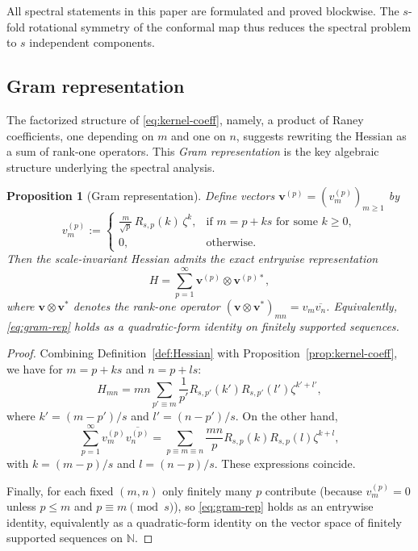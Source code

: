 \documentclass[11pt]{amsart}
\numberwithin{equation}{section}
\theoremstyle{plain}
\newtheorem{proposition}[theorem]{Proposition}
\theoremstyle{definition}
\theoremstyle{remark}
\begin{document}
All spectral statements in this paper are formulated and proved blockwise. The
$s$-fold rotational symmetry of the conformal map thus reduces the spectral
problem to $s$ independent components.

\subsection{Gram representation}
\label{subsec:gram-representation}

The factorized structure of \eqref{eq:kernel-coeff}, namely, a product of Raney
coefficients, one depending on $m$ and one on $n$, suggests rewriting
the Hessian as a sum of rank-one operators. This \emph{Gram representation}
is the key algebraic structure underlying the spectral analysis.

\begin{proposition}[Gram representation]
	\label{prop:gram}
	Define vectors $\bm{v}^{(p)} = (v^{(p)}_{m})_{m \ge 1}$ by
	\begin{equation}\label{eq:gram-vector}
		v^{(p)}_{m} :=
		\begin{cases}
			\displaystyle \frac{m}{\sqrt{p}} \, R_{s,p}(k) \, \zeta^k,
			   & \text{if } m = p + ks \text{ for some } k \ge 0, \\[1ex]
			0, & \text{otherwise}.
		\end{cases}
	\end{equation}
	Then the scale-invariant Hessian admits the exact entrywise representation
	\begin{equation}\label{eq:gram-rep}
		H = \sum_{p=1}^{\infty} \bm{v}^{(p)} \otimes \bm{v}^{(p)*},
	\end{equation}
	where $\bm{v} \otimes \bm{v}^*$ denotes the rank-one operator
	$(\bm{v} \otimes \bm{v}^*)_{m n} = v_{m} \overline{v_{n}}$. Equivalently,
	\eqref{eq:gram-rep} holds as a quadratic-form identity on finitely supported
	sequences.
\end{proposition}

\begin{proof}
	Combining Definition~\ref{def:Hessian} with Proposition~\ref{prop:kernel-coeff},
	we have for $m = p + ks$ and $n = p + ls$:
	\[
		H_{mn} = mn \sum_{p' \equiv m} \frac{1}{p'} R_{s,p'}(k') R_{s,p'}(l') \zeta^{k'+l'},
	\]
	where $k' = (m - p')/s$ and $l' = (n - p')/s$. On the other hand,
	\[
		\sum_{p=1}^{\infty} v^{(p)}_{m} \overline{v^{(p)}_{n}}
		= \sum_{p \equiv m \equiv n} \frac{mn}{p} R_{s,p}(k) R_{s,p}(l) \zeta^{k+l},
	\]
	with $k = (m-p)/s$ and $l = (n-p)/s$. These expressions coincide.

	Finally, for each fixed $(m,n)$ only finitely many $p$ contribute
	(because $v^{(p)}_m=0$ unless $p\le m$ and $p\equiv m \!\!\pmod{s}$),
	so \eqref{eq:gram-rep} holds as an entrywise identity, equivalently as a
	quadratic-form identity on the vector space of finitely supported sequences on $\mathbb N$.
\end{proof}
\end{document}
